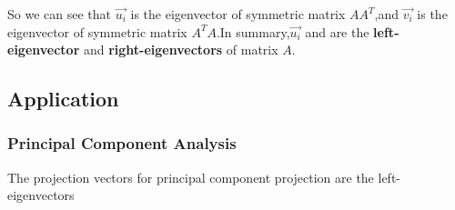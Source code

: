 So we can see that $\vec{u_i}$ is the eigenvector of symmetric matrix $AA^T$,and $\vec{v_i}$ is the eigenvector of symmetric matrix $A^TA$.In summary,$\vec{u_i}$ and  are the \textbf{left-eigenvector} and \textbf{right-eigenvectors} of matrix $A$.
\subsection{Application}
\subsubsection{Principal Component Analysis}
The projection vectors for principal component projection are the left-eigenvectors